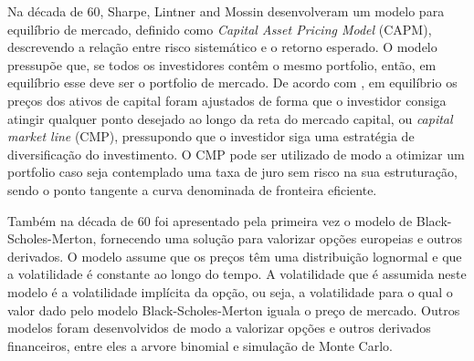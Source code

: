 \documentclass[
  12pt,
  brazil,
  a4paper,
  openany]{book}
\begin{document}
Na década de 60, Sharpe, Lintner and Mossin desenvolveram um modelo para equilíbrio de mercado, definido como \emph{Capital Asset Pricing Model} (CAPM), descrevendo a relação entre risco sistemático e o retorno esperado. O modelo pressupõe que, se todos os investidores contêm o mesmo portfolio, então, em equilíbrio esse deve ser o portfolio de mercado. De acordo com \textcite{Sharpe1964}, em equilíbrio os preços dos ativos de capital foram ajustados de forma que o investidor consiga atingir qualquer ponto desejado ao longo da reta do mercado capital, ou \emph{capital market line} (CMP), pressupondo que o investidor siga uma estratégia de diversificação do investimento. O CMP pode ser utilizado de modo a otimizar um portfolio caso seja contemplado uma taxa de juro sem risco na sua estruturação, sendo o ponto tangente a curva denominada de fronteira eficiente.

Também na década de 60 foi apresentado pela primeira vez o modelo de Black-Scholes-Merton, fornecendo uma solução para valorizar opções europeias e outros derivados. O modelo assume que os preços têm uma distribuição lognormal e que a volatilidade é constante ao longo do tempo. A volatilidade que é assumida neste modelo é a volatilidade implícita da opção, ou seja, a volatilidade para o qual o valor dado pelo modelo Black-Scholes-Merton iguala o preço de mercado. Outros modelos foram desenvolvidos de modo a valorizar opções e outros derivados financeiros, entre eles a arvore binomial e simulação de Monte Carlo.
\end{document}

